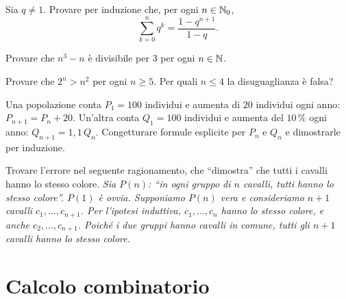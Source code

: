 \begin{esercizio}[\liv{2}]
Sia $q\ne1$. Provare per induzione che, per ogni $n\in\mathbb N_{0}$,
\[
\sum_{k=0}^{n}q^{k}=\frac{1-q^{n+1}}{1-q}.
\]
\end{esercizio}

\begin{esercizio}[\liv{2}]
Provare che $n^{3}-n$ \`e divisibile per $3$ per ogni $n\in\mathbb N$.
\end{esercizio}

\begin{esercizio}[\liv{2}]
Provare che $2^{n}>n^{2}$ per ogni $n\ge5$. Per quali $n\le4$ la disuguaglianza \`e falsa?
\end{esercizio}

\begin{esercizio}[\liv{2}]
Una popolazione conta $P_{1}=100$ individui e aumenta di $20$ individui ogni anno: $P_{n+1}=P_{n}+20$. Un'altra conta $Q_{1}=100$ individui e aumenta del $10\,\%$ ogni anno: $Q_{n+1}=1{,}1\,Q_{n}$. Congetturare formule esplicite per $P_{n}$ e $Q_{n}$ e dimostrarle per induzione.
\end{esercizio}

\begin{esercizio}[\liv{3}]
Trovare l'errore nel seguente ragionamento, che ``dimostra'' che tutti i cavalli hanno lo stesso colore. \textit{Sia $P(n)$: ``in ogni gruppo di $n$ cavalli, tutti hanno lo stesso colore''. $P(1)$ \`e ovvia. Supponiamo $P(n)$ vera e consideriamo $n+1$ cavalli $c_{1},\ldots,c_{n+1}$. Per l'ipotesi induttiva, $c_{1},\ldots,c_{n}$ hanno lo stesso colore, e anche $c_{2},\ldots,c_{n+1}$. Poich\'e i due gruppi hanno cavalli in comune, tutti gli $n+1$ cavalli hanno lo stesso colore.}
\end{esercizio}

\section{Calcolo combinatorio}

